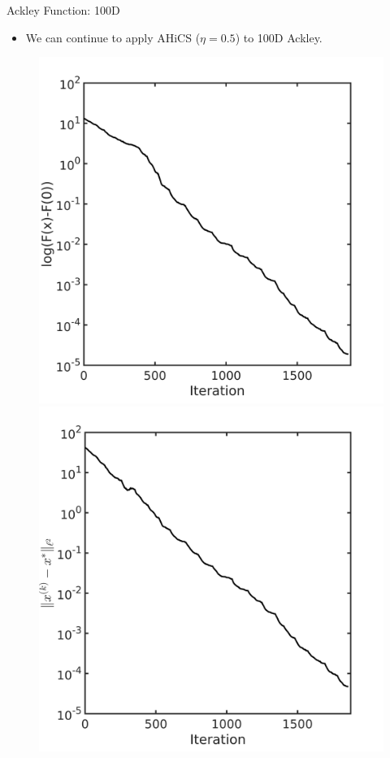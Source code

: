 \documentclass{beamer}
\begin{document}
\begin{frame}{Ackley Function: 100D}
	\begin{itemize}
		\item We can continue to apply AHiCS ($\eta=0.5$) to 100D Ackley.
	\end{itemize}
\begin{figure}[!htbp]
	\centering
	  \includegraphics[scale=0.2]{./figures/ackley100D.png}
	  \includegraphics[scale=0.2]{./figures/ackley100D_dist.png}
\end{figure}
\end{frame}
\end{document}

